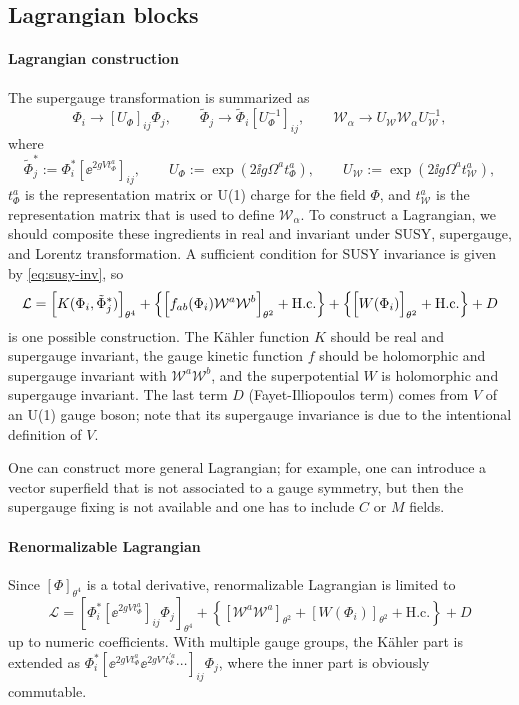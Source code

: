 \documentclass[CheatSheet]{subfiles}
\begin{document}
\subsection{Lagrangian blocks}
\paragraph{Lagrangian construction}
The supergauge transformation is summarized as
\begin{equation}
 \Phi_i   \to [U_{\Phi}]_{ij}\Phi_j,
\qquad
 \tilde\Phi_j \to \tilde\Phi_i [U_\Phi^{-1}]_{ij},
\qquad
\mathcal W_\alpha\to U_{\mathcal W}\mathcal W_\alpha U_{\mathcal W}^{-1},
\end{equation}
where
\begin{equation}
 \tilde\Phi^*_j :=  \Phi^*_i [\ee^{2gV t^a_\Phi}]_{ij},
\qquad
 U_\Phi:=\exp(2\ii g \Omega^at^{a}_\Phi),
\qquad
 U_{\mathcal W}:=\exp(2\ii g \Omega^at^{a}_{\mathcal W}),
\end{equation}
$t^a_\Phi$ is the representation matrix or U(1) charge for the field $\Phi$,
and $t^a_{\mathcal W}$ is the representation matrix that is used to define $\mathcal W_\alpha$.
To construct a Lagrangian, we should composite these ingredients in real and invariant under SUSY, supergauge, and Lorentz transformation.
A sufficient condition for SUSY invariance is given by \eqref{eq:susy-inv}, so
\begin{equation}
 \mathcal L =
\Bigl[K(\Phi_i, \tilde\Phi^*_j)\Bigr]_{\theta^4}
+
\left\{
\Bigl[f_{ab}(\Phi_i)\mathcal W^a\mathcal W^b\Bigr]_{\theta^2} + \text{H.c.}
\right\}
+
\left\{
\Bigl[W(\Phi_i)\Bigr]_{\theta^2} + \text{H.c.}
\right\} + D
\end{equation}
is one possible construction.
The K\"ahler function $K$ should be real and supergauge invariant, the gauge kinetic function $f$ should be holomorphic and supergauge invariant with $\mathcal W^a\mathcal W^b$, and the superpotential $W$ is holomorphic and supergauge invariant.  The last term $D$ (Fayet-Illiopoulos term) comes from $V$ of an U(1) gauge boson; note that its supergauge invariance is due to the intentional definition of $V$.

One can construct more general Lagrangian; for example, one can introduce a vector superfield that is not associated to a gauge symmetry, but then the supergauge fixing is not available and one has to include $C$ or $M$ fields.

\paragraph{Renormalizable Lagrangian}
Since $[\Phi]_{\theta^4}$ is a total derivative, renormalizable Lagrangian is limited to
\begin{equation}
  \mathcal L =
\left[\Phi^*_i [\ee^{2gV t^a_\Phi}]_{ij}\Phi_j\right]_{\theta^4}
+
\left\{
\left[\mathcal W^a\mathcal W^a\right]_{\theta^2} 
+\left[W(\Phi_i)\right]_{\theta^2} + \text{H.c.}
\right\}
+
D
\end{equation}
up to numeric coefficients. With multiple gauge groups, the K\"ahler part is extended as
$\Phi^*_i [\ee^{2gV t^a_\Phi}\ee^{2gV' t^{\prime a}_\Phi}\cdots]_{ij}\Phi_j$, where the inner part is obviously commutable.
\end{document}
